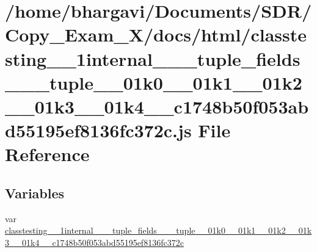 \hypertarget{classtesting__1__1internal__1__1__tuple__fields__3__01__tuple__00__01k0__00__01k1__00__01k2__00_ddc2886f5df4df100f97d8f55cc5dce8}{}\section{/home/bhargavi/\+Documents/\+S\+D\+R/\+Copy\+\_\+\+Exam\+\_\+X/docs/html/classtesting\+\_\+\_\+1internal\+\_\+\_\+\_\+tuple\+\_\+fields\+\_\+\_\+\_\+tuple\+\_\+\_\+01k0\+\_\+\_\+01k1\+\_\+\_\+01k2\+\_\+\_\+01k3\+\_\+\_\+01k4\+\_\+\_\+c1748b50f053abd55195ef8136fc372c.js File Reference}
\label{classtesting__1__1internal__1__1__tuple__fields__3__01__tuple__00__01k0__00__01k1__00__01k2__00_ddc2886f5df4df100f97d8f55cc5dce8}
\subsection*{Variables}
\begin{DoxyCompactItemize}
\item 
var \hyperlink{classtesting__1__1internal__1__1__tuple__fields__3__01__tuple__00__01k0__00__01k1__00__01k2__00_ddc2886f5df4df100f97d8f55cc5dce8_ae047904c67b1f554ccd8848a7d576e63}{classtesting\+\_\+\_\+1internal\+\_\+\_\+\_\+tuple\+\_\+fields\+\_\+\_\+\_\+tuple\+\_\+\_\+01k0\+\_\+\_\+01k1\+\_\+\_\+01k2\+\_\+\_\+01k3\+\_\+\_\+01k4\+\_\+\_\+c1748b50f053abd55195ef8136fc372c}
\end{DoxyCompactItemize}


